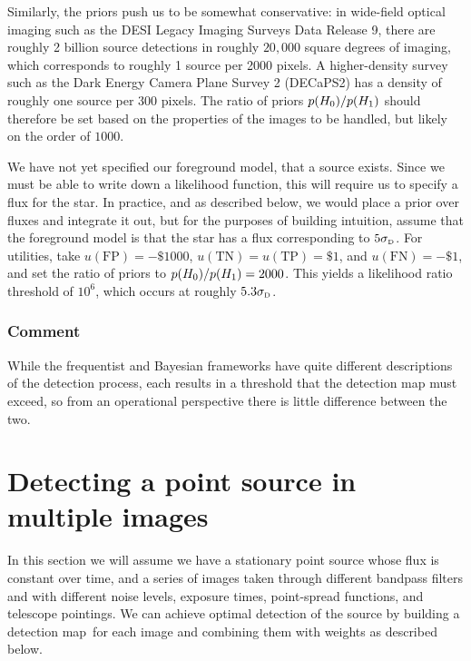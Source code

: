 \documentclass[11pt,letterpaper,linenumbers]{aastex63}
\newcommand{\detmap}{detection map}
\newcommand{\sigd}{\sigma_{\mbox{\rmfamily\tiny D}}}
\newcommand{\truepos}{\ensuremath{\mathrm{TP}}}
\newcommand{\falsepos}{\ensuremath{\mathrm{FP}}}
\newcommand{\trueneg}{\ensuremath{\mathrm{TN}}}
\newcommand{\falseneg}{\ensuremath{\mathrm{FN}}}
\begin{document}
Similarly, the priors push us to be somewhat conservative: in
wide-field optical imaging such as the DESI Legacy Imaging Surveys
\citep{lsoverview} Data Release 9, there are roughly 2 billion source
detections in roughly $20,000$ square degrees of imaging, which
corresponds to roughly 1 source per 2000 pixels.  A higher-density
survey such as the Dark Energy Camera Plane Survey 2 (DECaPS2)
\citep{decaps2} has a density of roughly one source per 300 pixels.
The ratio of priors $p(H_0) / p(H_1)$ should therefore be set based on
the properties of the images to be handled, but likely on the order of
$1000$.

We have not yet specified our foreground model, that a source exists.
Since we must be able to write down a likelihood function, this will
require us to specify a flux for the star.  In practice, and as
described below, we would place a prior over fluxes and integrate it
out, but for the purposes of building intuition, assume that the
foreground model is that the star has a flux corresponding to
$5 \sigd$.  For utilities, take $u(\falsepos) = -\$1000$, 
$u(\trueneg) = u(\truepos) = \$1$, and $u(\falseneg) = -\$1$, and
set the ratio of priors to $p(H_0)/p(H_1) = 2000$.
This yields a likelihood ratio threshold of $10^6$, which occurs at
roughly $5.3 \sigd$.


\subsubsection{Comment}


While the frequentist and Bayesian frameworks have quite different
descriptions of the detection process, each results in a threshold
that the detection map must exceed, so from an operational perspective
there is little difference between the two.


\section{Detecting a point source in multiple images}

In this section we will assume we have a stationary point source whose
flux is constant over time, and a series of images taken through
different bandpass filters and with different noise levels, exposure
times, point-spread functions, and telescope pointings.  We can
achieve optimal detection of the source by building a \detmap\ for
each image and combining them with weights as described below.
\end{document}
